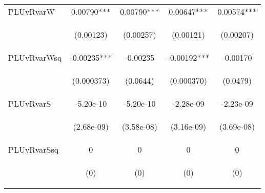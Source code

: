 \begin{center}
\begin{tabular}{lcccc}
PLUvRvarW & 0.00790*** & 0.00790*** & 0.00647*** & 0.00574*** \\
\vspace{4pt} & \begin{footnotesize}(0.00123)\end{footnotesize} & \begin{footnotesize}(0.00257)\end{footnotesize} & \begin{footnotesize}(0.00121)\end{footnotesize} & \begin{footnotesize}(0.00207)\end{footnotesize} \\
PLUvRvarWsq & -0.00235*** & -0.00235 & -0.00192*** & -0.00170 \\
\vspace{4pt} & \begin{footnotesize}(0.000373)\end{footnotesize} & \begin{footnotesize}(0.0644)\end{footnotesize} & \begin{footnotesize}(0.000370)\end{footnotesize} & \begin{footnotesize}(0.0479)\end{footnotesize} \\
PLUvRvarS & -5.20e-10 & -5.20e-10 & -2.28e-09 & -2.23e-09 \\
\vspace{4pt} & \begin{footnotesize}(2.68e-09)\end{footnotesize} & \begin{footnotesize}(3.58e-08)\end{footnotesize} & \begin{footnotesize}(3.16e-09)\end{footnotesize} & \begin{footnotesize}(3.69e-08)\end{footnotesize} \\
PLUvRvarSsq & 0 & 0 & 0 & 0 \\
\vspace{4pt} & \begin{footnotesize}(0)\end{footnotesize} & \begin{footnotesize}(0)\end{footnotesize} & \begin{footnotesize}(0)\end{footnotesize} & \begin{footnotesize}(0)\end{footnotesize} \\

\end{tabular}
\end{center}
